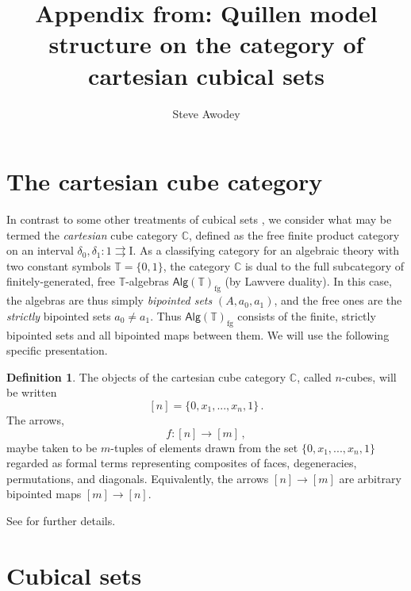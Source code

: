 \documentclass[11pt]{article}
\newcommand{\C}{\ensuremath{\mathbb{C}}}
\newcommand{\ra}{\ensuremath{\rightarrow}}
\newcommand{\I}{\ensuremath{\mathrm{I}}}
\theoremstyle{remark}
\theoremstyle{definition}
\newtheorem{definition}[theorem]{Definition}
\begin{document}

\title{Appendix from: Quillen model structure on the category of cartesian cubical sets}
\author{Steve Awodey}
\maketitle

\setcounter{tocdepth}{1}
\tableofcontents

\section{The cartesian cube category}

In contrast to some other treatments of cubical sets \cite{Grandis, Grandis, Jardine, Jardine, Bezem, OrtonPitts, Coquand, Cisinski}, we consider what may be termed the \emph{cartesian} cube category  $\mathbb{C}$, defined as the free finite product category on an interval $\delta_0, \delta_1 : 1\rightrightarrows \I$.
As a classifying category for an algebraic theory with two constant symbols $\mathbb{T} = \{0, 1\}$, the category $\C$ is dual to the full subcategory of finitely-generated, free $\mathbb{T}$-algebras $\mathsf{Alg}(\mathbb{T})_{\mathrm{fg}}$ (by Lawvere duality).  In this case, the algebras are thus simply \emph{bipointed sets} $(A, a_0, a_1)$, and the free ones are the \emph{strictly} bipointed sets $a_0\neq a_1$.  Thus $\mathsf{Alg}(\mathbb{T})_{\mathrm{fg}}$ consists of the finite, strictly bipointed sets and all bipointed maps between them.  We will use the following specific presentation.

\begin{definition}
The objects of the cartesian cube category $\C$, called $n$-cubes, will be written $$[n] = \{0, x_1, ..., x_n, 1\}\,.$$  
The arrows,
\[
f : [n] \to [m]\,,
\]
maybe taken to be $m$-tuples of elements drawn from the set $\{0, x_1, ..., x_n, 1\}$ regarded as formal terms representing composites of faces, degeneracies, permutations, and diagonals.  Equivalently, the arrows $[n] \ra [m]$ are arbitrary bipointed maps $[m]\ra [n]$.
\end{definition}
See \cite{parker:thesis} for further details.

\section{Cubical sets}
\end{document}
